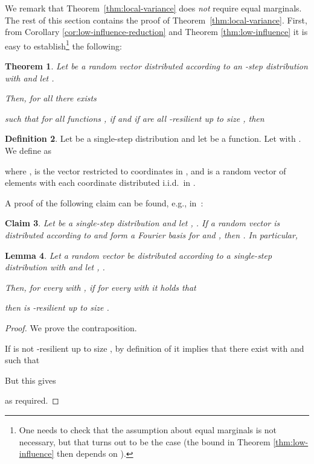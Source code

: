 \documentclass{daj}
\newcommand{\1}{\mathbbm{1}}
\theoremstyle{plain}
\newtheorem{theorem}{Theorem}[section]
\newtheorem{lemma}[theorem]{Lemma}
\newtheorem{claim}[theorem]{Claim}
\theoremstyle{definition}
\newtheorem{definition}[theorem]{Definition}
\begin{document}
We remark that Theorem~\ref{thm:local-variance} 
does \emph{not} require equal marginals.
The rest of this section contains the proof of Theorem~\ref{thm:local-variance}.
First, from Corollary \ref{cor:low-influence-reduction} and
Theorem \ref{thm:low-influence} it is easy to establish\footnote{
One needs to check that the assumption about equal marginals is not necessary,
but that turns out to be the case (the bound in Theorem \ref{thm:low-influence}
then depends on ).
} the following:
\begin{theorem}\label{thm:stabilityExpectation}
Let  be a random vector distributed according to
an -step distribution  with  and
let .

Then, for
all  there exists
 
such that for all functions
,
if  and
if  are all -resilient up to size
, then

\end{theorem}

\begin{definition}
Let  be a single-step distribution and let 
 be a 
function. Let  with .
We define  as

where , 
is the vector  restricted to coordinates in ,
and  is a random vector of
 elements with each coordinate distributed i.i.d.~in .
\end{definition}

A proof of the following claim can be found, e.g., in~\cite{Dol14}:
\begin{claim}
\label{cl:fourier-vs-variance}
Let  be a single-step distribution and let 
, .
If a random vector  
is distributed according to 
and  form a Fourier basis for  and
, then
.
In particular,

\end{claim}

\begin{lemma}\label{lem:localInfluenceToStability}
Let a random vector  be distributed according to a single-step
distribution  with 
 and
let , .

Then, for every 
with , if for every
 with  it holds that

then  is -resilient up to size .
\end{lemma}
\begin{proof}
We prove the contraposition. 

If  is not -resilient up to size , by definition
of  it implies that there exist  with
 and  such that

But this gives

as required.
\end{proof}
\end{document}
